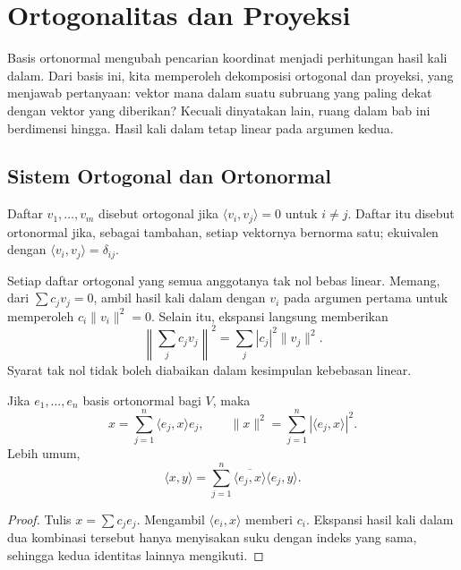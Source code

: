 \chapter{Ortogonalitas dan Proyeksi}
\label{ch:ortogonalitas}

Basis ortonormal mengubah pencarian koordinat menjadi perhitungan
hasil kali dalam. Dari basis ini, kita memperoleh dekomposisi
ortogonal dan proyeksi, yang menjawab pertanyaan: vektor mana
dalam suatu subruang yang paling dekat dengan vektor yang diberikan?
Kecuali dinyatakan lain, ruang dalam bab ini berdimensi hingga.
Hasil kali dalam tetap linear pada argumen kedua.

\section{Sistem Ortogonal dan Ortonormal}

\begin{definisi}
    Daftar $v_1,\ldots,v_m$ disebut ortogonal jika
    $\langle v_i,v_j\rangle=0$ untuk $i\ne j$.
    Daftar itu disebut ortonormal jika, sebagai tambahan,
    setiap vektornya bernorma satu; ekuivalen dengan
    $\langle v_i,v_j\rangle=\delta_{ij}$.
\end{definisi}

Setiap daftar ortogonal yang semua anggotanya tak nol bebas linear.
Memang, dari $\sum c_jv_j=0$, ambil hasil kali dalam dengan
$v_i$ pada argumen pertama untuk memperoleh $c_i\|v_i\|^2=0$.
Selain itu, ekspansi langsung memberikan
\[
    \left\|\sum_jc_jv_j\right\|^2=\sum_j|c_j|^2\|v_j\|^2.
\]
Syarat tak nol tidak boleh diabaikan dalam kesimpulan kebebasan linear.

\begin{teorema}
    Jika $e_1,\ldots,e_n$ basis ortonormal bagi $V$, maka
    \[
        x=\sum_{j=1}^n\langle e_j,x\rangle e_j,
        \qquad \|x\|^2=\sum_{j=1}^n|\langle e_j,x\rangle|^2.
    \]
    Lebih umum,
    \[
        \langle x,y\rangle
        =\sum_{j=1}^n\overline{\langle e_j,x\rangle}\langle e_j,y\rangle.
    \]
\end{teorema}
\begin{proof}
    Tulis $x=\sum c_je_j$. Mengambil $\langle e_i,x\rangle$
    memberi $c_i$. Ekspansi hasil kali dalam dua kombinasi
    tersebut hanya menyisakan suku dengan indeks yang sama,
    sehingga kedua identitas lainnya mengikuti.
\end{proof}

